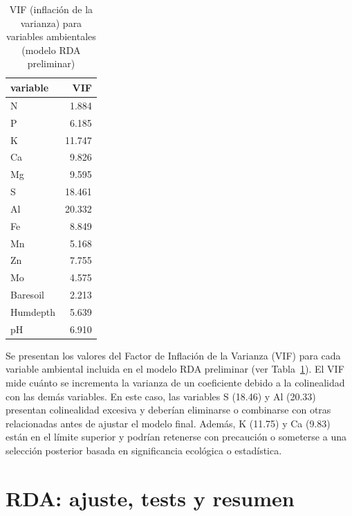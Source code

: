 \documentclass[
  spanish,
  11pt,
  a4paper,
  DIV=11,
  numbers=noendperiod]{scrartcl}
\begin{document}
\begin{longtable}[]{@{}lr@{}}

\caption{\label{tbl-cca-rda-vif}VIF (inflación de la varianza) para
variables ambientales (modelo RDA preliminar)}

\tabularnewline

\toprule\noalign{}
variable & VIF \\
\midrule\noalign{}
\endhead
\bottomrule\noalign{}
\endlastfoot
N & 1.884 \\
P & 6.185 \\
K & 11.747 \\
Ca & 9.826 \\
Mg & 9.595 \\
S & 18.461 \\
Al & 20.332 \\
Fe & 8.849 \\
Mn & 5.168 \\
Zn & 7.755 \\
Mo & 4.575 \\
Baresoil & 2.213 \\
Humdepth & 5.639 \\
pH & 6.910 \\

\end{longtable}

Se presentan los valores del Factor de Inflación de la Varianza (VIF)
para cada variable ambiental incluida en el modelo RDA preliminar (ver
Tabla~\ref{tbl-cca-rda-vif}). El VIF mide cuánto se incrementa la
varianza de un coeficiente debido a la colinealidad con las demás
variables. En este caso, las variables S (18.46) y Al (20.33) presentan
colinealidad excesiva y deberían eliminarse o combinarse con otras
relacionadas antes de ajustar el modelo final. Además, K (11.75) y Ca
(9.83) están en el límite superior y podrían retenerse con precaución o
someterse a una selección posterior basada en significancia ecológica o
estadística.

\section{RDA: ajuste, tests y resumen}\label{rda-ajuste-tests-y-resumen}
\end{document}
